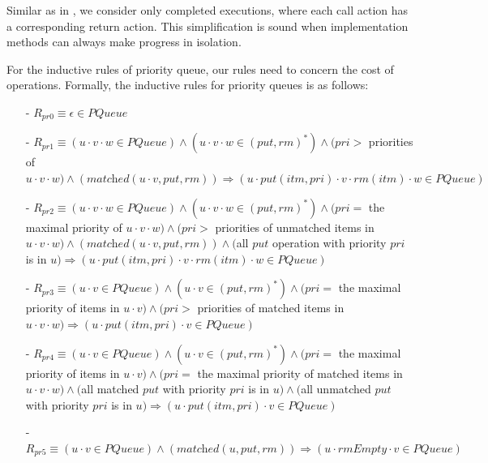 \documentclass{llncs}
\begin{document}
Similar as in \cite{Bouajjani:2015}, we consider only completed executions, where each call action has a corresponding return action. This simplification is sound when implementation methods can always make progress in isolation.

For the inductive rules of priority queue, our rules need to concern the cost of operations. Formally, the inductive rules for priority queues is as follows:

\begin{itemize}
\setlength{\itemsep}{0.5pt}
\item[-] $R_{\textit{pr0}} \equiv \epsilon \in \textit{PQueue}$

\item[-] $R_{\textit{pr1}} \equiv (u \cdot v \cdot w \in \textit{PQueue}) \wedge (u \cdot v \cdot w \in (\textit{put},\textit{rm})^*) \wedge (\textit{pri} >$ priorities of $u \cdot v \cdot w ) \wedge (\textit{matched}(u \cdot v, \textit{put}, \textit{rm}) ) \Rightarrow (u \cdot \textit{put}(\textit{itm},\textit{pri}) \cdot v \cdot \textit{rm}(\textit{itm}) \cdot w \in \textit{PQueue})$

\item[-] $R_{\textit{pr2}} \equiv (u \cdot v \cdot w \in \textit{PQueue}) \wedge (u \cdot v \cdot w \in (\textit{put},\textit{rm})^*) \wedge (\textit{pri} =$ the maximal priority of $u \cdot v \cdot w ) \wedge (\textit{pri} >$ priorities of unmatched items in $u \cdot v \cdot w) \wedge (\textit{matched}(u \cdot v, \textit{put}, \textit{rm}) ) \wedge ($all $\textit{put}$ operation with priority $\textit{pri}$ is in $u) \Rightarrow (u \cdot \textit{put}(\textit{itm},\textit{pri}) \cdot v \cdot \textit{rm}(\textit{itm}) \cdot w \in \textit{PQueue})$

\item[-] $R_{\textit{pr3}} \equiv (u \cdot v \in \textit{PQueue}) \wedge ( u \cdot v \in (\textit{put},\textit{rm})^*) \wedge (\textit{pri} =$ the maximal priority of items in $u \cdot v) \wedge (\textit{pri} >$ priorities of matched items in $u \cdot v \cdot w ) \Rightarrow (u \cdot \textit{put}(\textit{itm},\textit{pri}) \cdot v \in \textit{PQueue})$

\item[-] $R_{\textit{pr4}} \equiv (u \cdot v \in \textit{PQueue}) \wedge ( u \cdot v \in (\textit{put},\textit{rm})^*) \wedge (\textit{pri} =$ the maximal priority of items in $u \cdot v) \wedge (\textit{pri} =$ the maximal priority of matched items in $u \cdot v \cdot w ) \wedge ($all matched $\textit{put}$ with priority $\textit{pri}$ is in $u) \wedge ($all unmatched $\textit{put}$ with priority $\textit{pri}$ is in $u) \Rightarrow (u \cdot \textit{put}(\textit{itm},\textit{pri}) \cdot v \in \textit{PQueue})$

\item[-] $R_{\textit{pr5}} \equiv (u \cdot v \in \textit{PQueue}) \wedge (\textit{matched}(u,\textit{put},\textit{rm}) ) \Rightarrow (u \cdot \textit{rmEmpty} \cdot v \in \textit{PQueue})$
\end{itemize}
\end{document}
